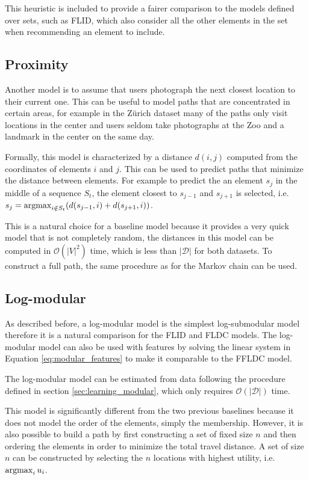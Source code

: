 This heuristic is included to provide a fairer comparison to the models defined over sets, such as FLID, which also consider all the other elements in the set when recommending an element to include.

\subsection{Proximity}

Another model is to assume that users photograph the next closest location to their current one. This can be useful to model paths that are concentrated in certain areas, for example in the Zürich dataset many of the paths only visit locations in the center and users seldom take photographs at the Zoo and a landmark in the center on the same day.

Formally, this model is characterized by a distance $d(i,j)$ computed from the coordinates of elements $i$ and $j$. This can be used to predict paths that minimize the distance between elements. For example to predict the an element $s_{j}$ in the middle of a sequence $S_{t}$, the element closest to $s_{j-1}$ and $s_{j+1}$ is selected, i.e. $s_{j} = \operatorname*{argmax}_{i \notin S_{t}}(d(s_{j-1}, i) + d(s_{j+1}, i))$.

This is a natural choice for a baseline model because it provides a very quick model that is not completely random, the distances in this model can be computed in $\mathcal{O}(|V|^{2})$ time, which is less than $|\mathcal{D}|$ for both datasets. To construct a full path, the same procedure as for the Markov chain can be used.

\subsection{Log-modular}

As described before, a log-modular model is the simplest log-submodular model therefore it is a natural comparison for the FLID and FLDC models. The log-modular model can also be used with features by solving the linear system in Equation \eqref{eq:modular_features} to make it comparable to the FFLDC model.

The log-modular model can be estimated from data following the procedure defined in section \ref{sec:learning_modular}, which only requires $\mathcal{O}(|\mathcal{D}|)$ time.

This model is significantly different from the two previous baselines because it does not model the order of the elements, simply the membership. However, it is also possible to build a path by first constructing a set of fixed size $n$ and then ordering the elements in order to minimize the total travel distance. A set of size $n$ can be constructed by selecting the $n$ locations with highest utility, i.e. $\operatorname*{argmax}_{i} u_{i}$.

